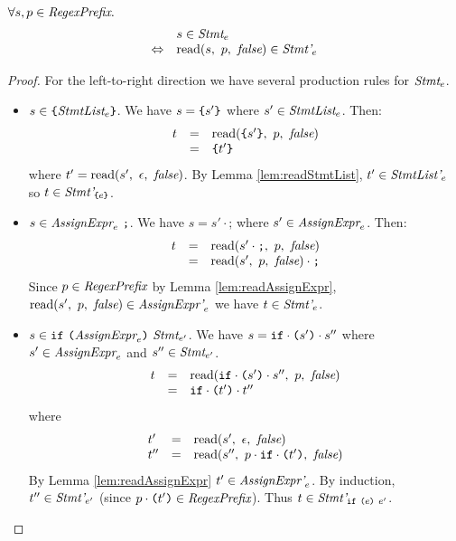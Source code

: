 \documentclass[preprint,10pt]{sigplanconf}
\begin{document}
\begin{lemma}\mbox{}
  
  \( \forall s, p \in \textit{RegexPrefix}. \)
  \[
  \begin{array}{rl}
  &s \in \textit{Stmt}_{e} 
  \\
  \Leftrightarrow &
  \textrm{read}(s,~p,~\textit{false}) \in \textit{Stmt'}_{e}
  \end{array}
  \]
\end{lemma}
\begin{proof}
  For the left-to-right direction we have several production rules for
  \( \textit{Stmt}_{e} \).
  \begin{itemize}

  \item \( s \in \texttt{\{}\textit{StmtList}_{e}\texttt{\}} \). We have \( s =
    \texttt{\{}s'\texttt{\}} \) where \( s' \in \textit{StmtList}_{e} \). Then:
    \[
    \begin{array}{rcl}
      t &=& \textrm{read}(\texttt{\{}s'\texttt{\}},~p,~\textit{false})
      \\
      &=& \texttt{\{}t'\texttt{\}}
    \end{array}
    \]
    where \( t' = \textrm{read}(s',~\epsilon,~\textit{false}) \). By Lemma
    \ref{lem:readStmtList}, \( t' \in \textit{StmtList'}_{e} \)
    so \( t \in \textit{Stmt'}_{\texttt{\{}e\texttt{\}}} \).


  \item \( s \in \textit{AssignExpr}_{e}~\texttt{;}
    \). We have \( s = s' \cdot \texttt{;} \) where \( s' \in
    \textit{AssignExpr}_{e} \). Then:
    \[
    \begin{array}{rcl}
      t &=& \textrm{read}(s'\cdot \texttt{;},~p,~\textit{false})
      \\
      &=& \textrm{read}(s',~p,~\textit{false}) \cdot \texttt{;}
    \end{array}
    \]
    Since \( p \in \textit{RegexPrefix} \) by Lemma
    \ref{lem:readAssignExpr}, \( \textrm{read}(s',~p,~\textit{false}) \in
    \textit{AssignExpr'}_{e} \) we have \( t \in
    \textit{Stmt'}_{e} \).

  \item \( s \in \texttt{if}~ \texttt{(}\textit{AssignExpr}_{e}\texttt{)}~
    \textit{Stmt}_{e'} \). We have \( s =
    \texttt{if}\cdot \texttt{(}s'\texttt{)}\cdot s'' \) where \( s' \in
    \textit{AssignExpr}_{e} \) and \( s'' \in \textit{Stmt}_{e'} \).
    \[
    \begin{array}{rcl}
      t &=& \textrm{read}(
        \texttt{if}\cdot \texttt{(}s'\texttt{)}\cdot s'' 
      ,~p,~\textit{false})
      \\
      &=& \texttt{if} \cdot \texttt{(}t'\texttt{)} \cdot t'' 
    \end{array}
    \]
    where 
    \[ 
    \begin{array}{lcl}
      t' &=& \textrm{read}(s',~\epsilon,~\textit{false})
      \\
      t'' &=& \textrm{read}(s'',~
        p \cdot \texttt{if} \cdot \texttt{(}t'\texttt{)}
      ,~\textit{false})
    \end{array}
    \]
    By Lemma \ref{lem:readAssignExpr} \( t' \in
    \textit{AssignExpr'}_{e} \). By induction, 
    \( t'' \in \textit{Stmt'}_{e'} \) (since
    \( p \cdot \texttt{(}t'\texttt{)} \in \textit{RegexPrefix} \)). Thus \( t \in
    \textit{Stmt'}_{\texttt{if}~\texttt{(}e\texttt{)}~e'} \).


\end{itemize}
\end{proof}
\end{document}
